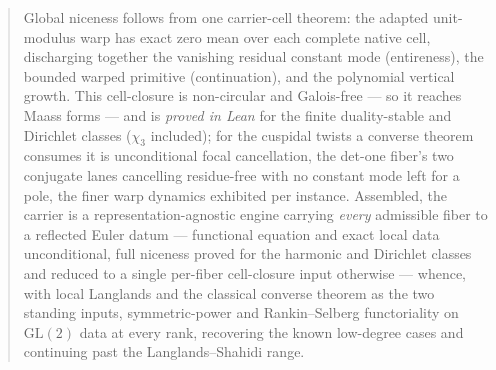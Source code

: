 \documentclass[11pt]{article}
\theoremstyle{definition}
\begin{document}
\begin{abstract}
Global niceness follows from one carrier-cell theorem: the adapted unit-modulus warp has exact zero
mean over each complete native cell, discharging together the vanishing residual constant mode
(entireness), the bounded warped primitive (continuation), and the polynomial vertical growth. This
cell-closure is non-circular and Galois-free --- so it reaches Maass forms --- and is \emph{proved in
Lean} for the finite duality-stable and Dirichlet classes ($\chi_3$ included); for the cuspidal twists
a converse theorem consumes it is unconditional focal cancellation, the det-one fiber's two conjugate
lanes cancelling residue-free with no constant mode left for a pole, the finer warp dynamics exhibited
per instance. Assembled, the carrier is a representation-agnostic engine carrying \emph{every}
admissible fiber to a reflected Euler datum --- functional equation and exact local data unconditional,
full niceness proved for the harmonic and Dirichlet classes and reduced to a single per-fiber
cell-closure input otherwise --- whence, with local Langlands and the classical converse theorem as the
two standing inputs, symmetric-power and Rankin--Selberg functoriality on $\mathrm{GL}(2)$ data at every
rank, recovering the known low-degree cases and continuing past the Langlands--Shahidi range.
\end{abstract}

\tableofcontents
\end{document}

